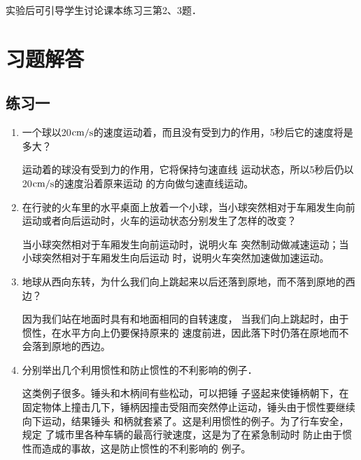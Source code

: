 实验后可引导学生讨论课本练习三第2、3题．

\section{习题解答}

\subsection{练习一}
\begin{enumerate}
	 \item 一个球以20${\rm cm/s}$的速度运动着，而且没有受到力的作用，5秒后它的速度将是多大？
	 
     \begin{solution}
        运动着的球没有受到力的作用，它将保持匀速直线
        运动状态，所以5秒后仍以20${\rm cm/s}$的速度沿着原来运动
        的方向做匀速直线运动。
     \end{solution}
	 \item 在行驶的火车里的水平桌面上放着一个小球，当小球突然相对于车厢发生向前运动或者向后运动时，火车的运动状态分别发生了怎样的改变？
	 
     \begin{solution}
        当小球突然相对于车厢发生向前运动时，说明火车
        突然制动做减速运动；当小球突然相对于车厢发生向后运动
        时，说明火车突然加速做加速运动。
     \end{solution}
	 \item 地球从西向东转，为什么我们向上跳起来以后还落到原地，而不落到原地的西边？
	 
     \begin{solution}
        因为我们站在地面时具有和地面相同的自转速度，
        当我们向上跳起时，由于惯性，在水平方向上仍要保持原来的
        速度前进，因此落下时仍落在原地而不会落到原地的西边。
     \end{solution}
	 \item 分别举出几个利用惯性和防止惯性的不利影响的例子．
	 
     \begin{solution}
        这类例子很多。锤头和木柄间有些松动，可以把锤
        子竖起来使锤柄朝下，在固定物体上撞击几下，锤柄因撞击受阻而突然停止运动，锤头由于惯性要继续向下运动，结果锤头
        和柄就套紧了。这是利用惯性的例子。为了行车安全，规定
        了城市里各种车辆的最高行驶速度，这是为了在紧急制动时
        防止由于惯性而造成的事故，这是防止惯性的不利影响的
        例子。
     \end{solution}
\end{enumerate}



